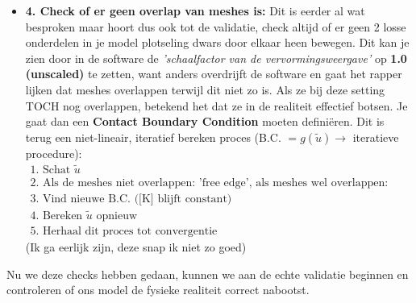 \documentclass[a4paper,11pt,twoside]{report}
\begin{document}
\begin{itemize}
          matrix [K] en de krachten continu updatet aan de hand van de nieuwe, vervormde vorm. Dus
          ($\{\tilde{F}\} = f(\tilde{u})$ en $[N] = g(\tilde{u}) \rightarrow$ iteratieve procedure):
          \begin{gather*}
              \text{1. Schat } \tilde{u} \\
              \text{2. Bereken } \{\tilde{F}\} \text{en} [N] \text{ op basis van } \tilde{u} \text{(doe dit op een nieuwe mesh)} \\
              \text{3. Vind } [K] \\
              \text{4. Bereken } \tilde{u} \text{ opnieuw met } [K] \\
              \text{5. Herhaal dit proces tot } \tilde{u} \text{ convergeert}
          \end{gather*}
    \item \textbf{4. Check of er geen overlap van meshes is:}
          \newline
          Dit is eerder al wat besproken maar hoort dus ook tot de validatie, check altijd of er geen 2 losse
          onderdelen in je model plotseling dwars door elkaar heen bewegen. Dit kan je zien door in de
          software de \textit{'schaalfactor van de vervormingsweergave'} op \textbf{1.0 (unscaled)} te
          zetten, want anders overdrijft de software en gaat het rapper lijken dat meshes overlappen terwijl
          dit niet zo is. Als ze bij deze setting TOCH nog overlappen, betekend het dat ze in de realiteit
          effectief botsen. Je gaat dan een \textbf{Contact Boundary Condition} moeten definiëren. Dit is
          terug een niet-lineair, iteratief bereken proces (B.C. $= g(\tilde{u}) \rightarrow$ iteratieve
          procedure):
          \begin{gather*}
              \text{1. Schat } \tilde{u} \\
              \text{2. Als de meshes niet overlappen: 'free edge', als meshes wel overlappen: gebruik een Glue B.C.} \\
              \text{3. Vind nieuwe B.C. ([K] blijft constant)} \\
              \text{4. Bereken } \tilde{u} \text{ opnieuw} \\
              \text{5. Herhaal dit proces tot convergentie}
          \end{gather*}
          (Ik ga eerlijk zijn, deze snap ik niet zo goed)
\end{itemize}
Nu we deze checks hebben gedaan, kunnen we aan de echte validatie beginnen en controleren of ons
model de fysieke realiteit correct nabootst.
\end{document}
